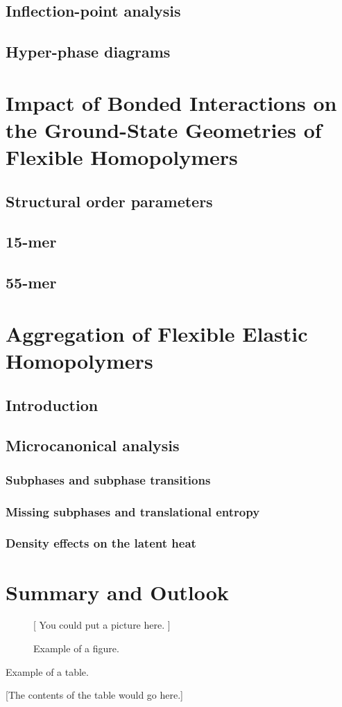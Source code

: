 \documentclass[12pt]{report}
\begin{document}
\section{Inflection-point analysis}
\section{Hyper-phase diagrams}

\chapter{Impact of Bonded Interactions on the Ground-State Geometries of Flexible Homopolymers}
\section{Structural order parameters}
\section{15-mer}
\section{55-mer}

\chapter{Aggregation of Flexible Elastic Homopolymers}
\section{Introduction}
\section{Microcanonical analysis}
\subsection{Subphases and subphase transitions}
\subsection{Missing subphases and translational entropy}
\subsection{Density effects on the latent heat}

\chapter{Summary and Outlook}










\begin{figure}
\centerline{[ You could put a picture here. ]}
\caption{Example of a figure.}
\end{figure}

\begin{table}
\caption{Example of a table.}
\centerline{[The contents of the table would go here.]}
\end{table}
\end{document}
